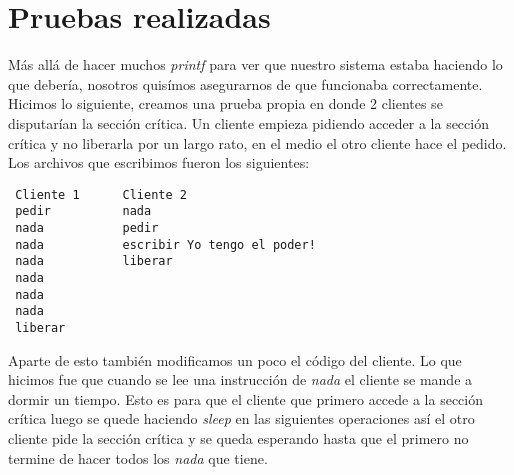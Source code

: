 \documentclass[a4paper, 10pt]{article}
\begin{document}
\section{Pruebas realizadas}

M\'as all\'a de hacer muchos \textit{printf} para ver que nuestro sistema estaba haciendo lo que deber\'ia, nosotros quis\'imos asegurarnos de que funcionaba correctamente.
Hicimos lo siguiente, creamos una prueba propia en donde 2 clientes se disputar\'ian la secci\'on cr\'itica.
Un cliente empieza pidiendo acceder a la secci\'on cr\'itica y no liberarla por un largo rato, en el medio el otro cliente hace el pedido. Los archivos que escribimos fueron los siguientes:

\vspace*{2em}
\lstset{language=[ANSI]C++}
\begin{lstlisting}
 Cliente 1 		Cliente 2
 pedir			nada
 nada			pedir
 nada			escribir Yo tengo el poder!
 nada			liberar
 nada
 nada
 nada
 liberar	
\end{lstlisting}
\vspace*{2em}


Aparte de esto tambi\'en modificamos un poco el c\'odigo del cliente. Lo que hicimos fue que cuando se lee una instrucci\'on de \textit{nada} el cliente se mande a dormir un tiempo. Esto es para que el cliente que primero accede a la secci\'on cr\'itica luego se quede haciendo \textit{sleep} en las siguientes operaciones as\'i el otro cliente pide la secci\'on cr\'itica y se queda esperando hasta que el primero no termine de hacer todos los \textit{nada} que tiene.
\end{document}
